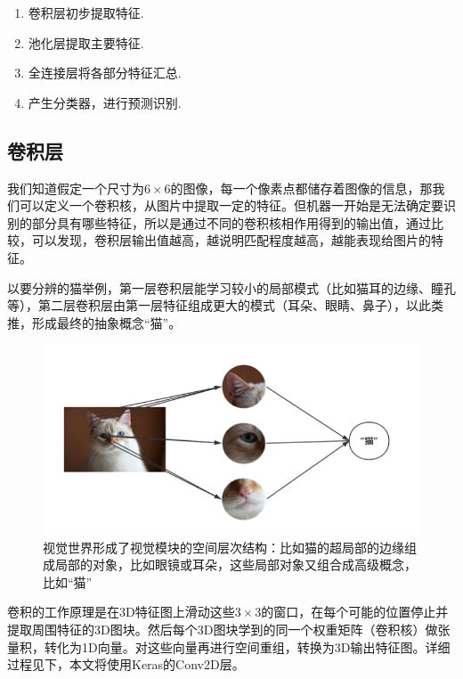\documentclass[lang=cn,11pt]{elegantpaper}
\begin{document}
\begin{enumerate}
	\item 卷积层初步提取特征.
	\item 池化层提取主要特征.
	\item 全连接层将各部分特征汇总.
	\item 产生分类器，进行预测识别.
\end{enumerate}

\subsection{卷积层}
我们知道假定一个尺寸为$6\times 6$的图像，每一个像素点都储存着图像的信息，那我们可以定义一个卷积核，从图片中提取一定的特征。但机器一开始是无法确定要识别的部分具有哪些特征，所以是通过不同的卷积核相作用得到的输出值，通过比较，可以发现，卷积层输出值越高，越说明匹配程度越高，越能表现给图片的特征。

以要分辨的猫举例，第一层卷积层能学习较小的局部模式（比如猫耳的边缘、瞳孔等），第二层卷积层由第一层特征组成更大的模式（耳朵、眼睛、鼻子），以此类推，形成最终的抽象概念“猫”。

\begin{figure}[hbtp]
	\centering
  \includegraphics{cat1}
  \caption{视觉世界形成了视觉模块的空间层次结构：比如猫的超局部的边缘组成局部的对象，比如眼镜或耳朵，这些局部对象又组合成高级概念，比如“猫”\label{fig:cat1}}
\end{figure}

卷积的工作原理是在3D特征图上滑动这些$3\times 3$的窗口，在每个可能的位置停止并提取周围特征的3D图块。然后每个3D图块学到的同一个权重矩阵（卷积核）做张量积，转化为1D向量。对这些向量再进行空间重组，转换为3D输出特征图。详细过程见下，本文将使用Keras的Conv2D层。
\end{document}
